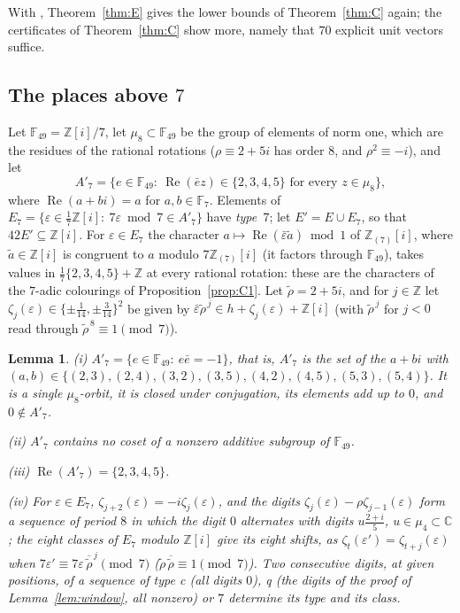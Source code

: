 \documentclass[11pt,a4paper]{amsart}
\newtheorem{lemma}{Lemma}
\theoremstyle{remark}
\newcommand{\Z}{\mathbb{Z}}
\newcommand{\C}{\mathbb{C}}
\newcommand{\F}{\mathbb{F}}
\begin{document}
With \cite[Theorem~1]{FC}, Theorem~\ref{thm:E} gives the lower bounds of Theorem~\ref{thm:C} again; the certificates
of Theorem~\ref{thm:C} show more, namely that $70$ explicit unit vectors suffice.

\subsection*{The places above \texorpdfstring{$7$}{7}}
Let $\F_{49}=\Z[i]/7$, let $\mu_8\subset\F_{49}$ be the group of elements of norm one, which are the residues of the
rational rotations ($\rho\equiv2+5i$ has order $8$, and $\rho^2\equiv-i$), and let
\[
A'_7=\{e\in\F_{49}:\ \operatorname{Re}(\bar ez)\in\{2,3,4,5\}\text{ for every }z\in\mu_8\},
\]
where $\operatorname{Re}(a+bi)=a$ for $a,b\in\F_7$. Elements of $E_7=\{\varepsilon\in\frac17\Z[i]:\
7\varepsilon\bmod7\in A'_7\}$ have \emph{type~$7$}; let $E'=E\cup E_7$, so that $42E'\subseteq\Z[i]$. For
$\varepsilon\in E_7$ the character $a\mapsto\operatorname{Re}(\bar\varepsilon\tilde a)\bmod1$ of $\Z_{(7)}[i]$, where
$\tilde a\in\Z[i]$ is congruent to $a$ modulo $7\Z_{(7)}[i]$ (it factors through $\F_{49}$), takes values in
$\frac17\{2,3,4,5\}+\Z$ at every rational rotation: these are the characters of the $7$-adic colourings of
Proposition~\ref{prop:C1}. Let $\tilde\rho=2+5i$, and for $j\in\Z$ let $\zeta_j(\varepsilon)\in\{\pm\frac1{14},
\pm\frac3{14}\}^2$ be given by $\bar\varepsilon\tilde\rho^{\,j}\in h+\zeta_j(\varepsilon)+\Z[i]$ (with $\tilde\rho^{\,j}$
for $j<0$ read through $\tilde\rho^{\,8}\equiv1\pmod 7$).

\begin{lemma}\label{lem:seven}
\textup{(i)} $A'_7=\{e\in\F_{49}:\ e\bar e=-1\}$, that is, $A'_7$ is the set of the $a+bi$ with
$(a,b)\in\{(2,3),(2,4),(3,2),(3,5),(4,2),(4,5),(5,3),(5,4)\}$. It is a single $\mu_8$-orbit, it is closed under conjugation, its elements add up to $0$, and $0\notin A'_7$.

\textup{(ii)} $A'_7$ contains no coset of a nonzero additive subgroup of $\F_{49}$.

\textup{(iii)} $\operatorname{Re}(A'_7)=\{2,3,4,5\}$.

\textup{(iv)} For $\varepsilon\in E_7$, $\zeta_{j+2}(\varepsilon)=-i\zeta_j(\varepsilon)$, and the digits
$\zeta_j(\varepsilon)-\rho\zeta_{j-1}(\varepsilon)$ form a sequence of period $8$ in which the digit $0$ alternates with digits $u\frac{2+i}5$, $u\in\mu_4\subset\C$; the eight classes of
$E_7$ modulo $\Z[i]$ give its eight shifts, as $\zeta_t(\varepsilon')=\zeta_{t+j}(\varepsilon)$ when
$7\varepsilon'\equiv7\varepsilon\,\overline{\tilde\rho}^{\,j}\pmod7$ \textup{(}$\tilde\rho\,\overline{\tilde\rho}\equiv1
\pmod7$\textup{)}. Two consecutive digits, at given positions, of a sequence of type c \textup{(}all digits
$0$\textup{)}, q \textup{(}the digits of the proof of Lemma~\ref{lem:window}, all nonzero\textup{)} or $7$ determine its
type and its class.
\end{lemma}
\end{document}
